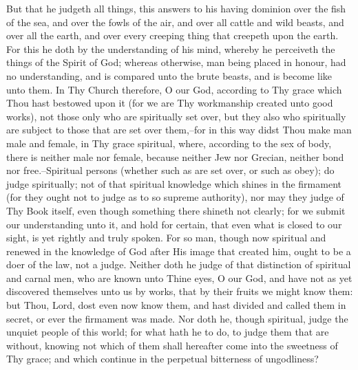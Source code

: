 \documentclass[b5paper,openright,12pt,twoside]{book}
\begin{document}
But that he judgeth all things, this answers to his having dominion over
the fish of the sea, and over the fowls of the air, and over all cattle
and wild beasts, and over all the earth, and over every creeping thing
that creepeth upon the earth. For this he doth by the understanding of
his mind, whereby he perceiveth the things of the Spirit of God; whereas
otherwise, man being placed in honour, had no understanding, and is
compared unto the brute beasts, and is become like unto them. In Thy
Church therefore, O our God, according to Thy grace which Thou hast
bestowed upon it (for we are Thy workmanship created unto good
works), not those only who are spiritually set over, but they also who
spiritually are subject to those that are set over them,--for in this
way didst Thou make man male and female, in Thy grace spiritual, where,
according to the sex of body, there is neither male nor female, because
neither Jew nor Grecian, neither bond nor free.--Spiritual persons
(whether such as are set over, or such as obey); do judge spiritually;
not of that spiritual knowledge which shines in the firmament (for they
ought not to judge as to so supreme authority), nor may they judge of
Thy Book itself, even though something there shineth not clearly; for we
submit our understanding unto it, and hold for certain, that even what
is closed to our sight, is yet rightly and truly spoken. For so man,
though now spiritual and renewed in the knowledge of God after His image
that created him, ought to be a doer of the law, not a judge. Neither
doth he judge of that distinction of spiritual and carnal men, who
are known unto Thine eyes, O our God, and have not as yet discovered
themselves unto us by works, that by their fruits we might know them:
but Thou, Lord, dost even now know them, and hast divided and called
them in secret, or ever the firmament was made. Nor doth he, though
spiritual, judge the unquiet people of this world; for what hath he
to do, to judge them that are without, knowing not which of them shall
hereafter come into the sweetness of Thy grace; and which continue in
the perpetual bitterness of ungodliness?
\end{document}
